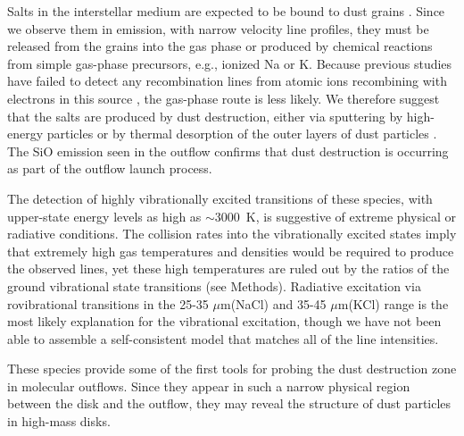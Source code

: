 \documentclass[12pt]{article}
\newcommand{\um}{\ensuremath{\mu \textrm{m}}\xspace}    %
\begin{document}
Salts in the interstellar medium are expected to be bound to dust grains
\cite{Cherchneff2012a}.  Since we observe them in emission, with narrow
velocity line profiles, they must be released from the grains into the gas
phase or produced by chemical reactions from simple gas-phase precursors,
e.g., ionized Na or K.  Because previous studies have failed to detect any
recombination lines from atomic ions recombining with electrons in this source
\cite{Plambeck2016a,Baez-Rubio2018a}, the gas-phase route is less likely. We
therefore suggest that the salts are produced by dust destruction, either via
sputtering by high-energy particles \cite{Schilke1997a} or by thermal
desorption of the outer layers of dust particles \cite{Decin2016a}.  The SiO
emission seen in the outflow confirms that dust destruction is occurring as
part of the outflow launch process.



The detection of highly vibrationally excited transitions of these species,
with upper-state energy levels as high as $\sim$3000~K, is suggestive of
extreme physical or radiative conditions.  
The collision rates into the vibrationally excited states imply that
extremely high gas temperatures and densities would be required to produce
the observed lines, yet these high temperatures are ruled out by the 
ratios of the ground vibrational state transitions (see Methods).
Radiative excitation via rovibrational transitions in the 25-35 \um (NaCl)
and 35-45 \um (KCl) range is the most likely explanation for the 
vibrational excitation, though we have not been able to assemble a self-consistent
model that matches all of the line intensities.

These species provide some of the first tools for probing the dust destruction
zone in molecular outflows.  Since they appear in such a narrow physical region
between the disk and the outflow, they may reveal the structure of dust particles
in high-mass disks.  
\end{document}
